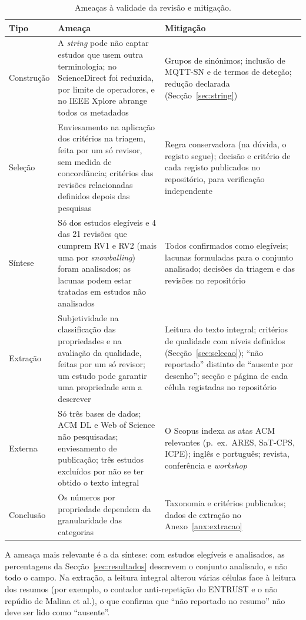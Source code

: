 \begin{table}[ht]
  \centering
  \caption{Ameaças à validade da revisão e mitigação.}
  \label{tab:validade}
  \small
  \begin{tabularx}{\textwidth}{@{}L{2.6cm}YY@{}}
    \toprule
    \textbf{Tipo} & \textbf{Ameaça} & \textbf{Mitigação} \\
    \midrule
    Construção & A \emph{string} pode não captar estudos que usem outra
      terminologia; no ScienceDirect foi reduzida, por limite de operadores, e no
      IEEE Xplore abrange todos os metadados & Grupos de sinónimos; inclusão de
      MQTT-SN e de termos de deteção; redução declarada (Secção~\ref{sec:string}) \\
    Seleção & Enviesamento na aplicação dos critérios na triagem, feita por um só
      revisor, sem medida de concordância; critérios das revisões relacionadas definidos
      depois das pesquisas & Regra conservadora (na dúvida, o registo segue); decisão e critério de cada
      registo publicados no repositório, para verificação independente \\
    Síntese & Só \nIncluidos{} dos \nElegiveis{} estudos elegíveis e 4 das 21
      revisões que cumprem RV1 e RV2 (mais uma por \emph{snowballing}) foram analisados; as lacunas podem
      estar tratadas em estudos não analisados & Todos confirmados
      como elegíveis; lacunas formuladas para o conjunto analisado; decisões
      da triagem e das revisões no repositório~\cite{mqttsecure2026repo} \\
    Extração & Subjetividade na classificação das propriedades e na avaliação da
      qualidade, feitas por um só revisor; um estudo pode garantir uma propriedade
      sem a descrever & Leitura do texto integral; critérios de qualidade com níveis
      definidos (Secção~\ref{sec:selecao});
      \enquote{não reportado} distinto de \enquote{ausente por desenho}; secção e
      página de cada célula registadas no repositório \\
    Externa & Só três bases de dados; ACM DL e Web of Science não pesquisadas;
      enviesamento de publicação; três estudos excluídos por não se ter obtido o
      texto integral & O Scopus indexa as atas ACM relevantes (p.\ ex.\
      ARES, SaT-CPS, ICPE); inglês e português; revista, conferência e
      \emph{workshop} \\
    Conclusão & Os números por propriedade dependem da granularidade das
      categorias & Taxonomia e critérios publicados; dados de extração no
      Anexo~\ref{anx:extracao} \\
    \bottomrule
  \end{tabularx}
\end{table}

A ameaça mais relevante é a da síntese: com \nElegiveis{} estudos elegíveis e
\nIncluidos{} analisados, as percentagens da Secção~\ref{sec:resultados} descrevem o
conjunto analisado, e não todo o campo. Na extração, a leitura integral alterou
várias células face à leitura dos resumos (por exemplo, o contador anti-repetição
do ENTRUST e o não repúdio de Malina et al.), o que confirma que \enquote{não
reportado no resumo} não deve ser lido como \enquote{ausente}.
